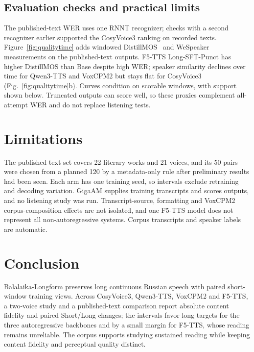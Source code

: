 \documentclass{article}
\newcommand{\corpus}{Balalaika-Longform}
\begin{document}
\subsection{Evaluation checks and practical limits}

The published-text WER uses one RNNT recognizer; checks with a second recognizer
earlier supported the CosyVoice3 ranking on recorded texts.
Figure~\ref{fig:qualitytime} adds windowed DistillMOS~\cite{stahl2025distillation}
and WeSpeaker~\cite{wang2022wespeaker} measurements on the published-text outputs.
F5-TTS Long-SFT-Punct has higher DistillMOS than Base despite high WER; speaker similarity declines over time for Qwen3-TTS and VoxCPM2 but stays flat
for CosyVoice3 (Fig.~\ref{fig:qualitytime}b). Curves condition on scorable windows, with support shown below. Truncated outputs can score well, so these
proxies complement all-attempt WER and do not replace listening tests.

\section{Limitations}
\label{sec:limitations}

The published-text set covers 22 literary works and 21 voices, and its 50 pairs
were chosen from a planned 120 by a metadata-only rule after preliminary results
had been seen. Each arm has one training seed, so intervals exclude retraining and
decoding variation. GigaAM supplies training transcripts and scores outputs, and
no listening study was run. Transcript-source, formatting and VoxCPM2
corpus-composition effects are not isolated, and one F5-TTS model does not
represent all non-autoregressive systems. Corpus transcripts and speaker labels
are automatic.

\section{Conclusion}
\label{sec:conclusion}

\corpus{} preserves long continuous Russian speech with paired short-window
training views. Across CosyVoice3, Qwen3-TTS, VoxCPM2 and F5-TTS, a two-voice
study and a published-text comparison report absolute content fidelity and paired
Short/Long changes; the intervals favor long targets for the three autoregressive
backbones and by a small margin for F5-TTS, whose reading remains unreliable. The corpus supports studying sustained reading
while keeping content fidelity and perceptual quality distinct.
\end{document}
